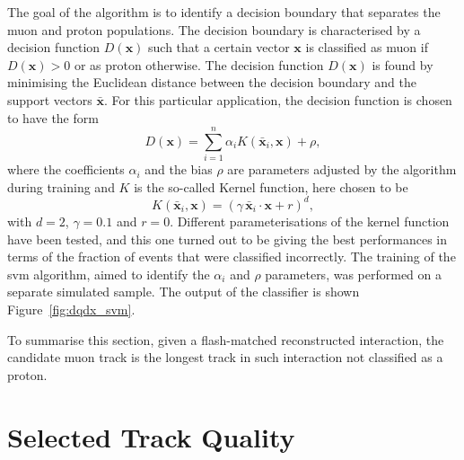 The goal of the algorithm is to identify a decision boundary that separates the muon and proton populations. The decision boundary is characterised by a decision function $D(\bm{x})$ such that a certain vector $\bm{x}$ is classified as muon if $D(\bm{x}) > 0$ or as proton otherwise.
The decision function $D(\bm{x})$ is found by minimising the Euclidean distance between the decision boundary and the support vectors $\bar{\bm{x}}$.
For this particular application, the decision function is chosen to have the form  
\begin{equation}
D(\bm{x}) =  \sum_{i=1}^{n} \alpha_i K( \bar{\bm{x}}_i, \bm{x}) + \rho,
\end{equation}
where the coefficients $\alpha_i$ and the bias $\rho$ are parameters adjusted by the algorithm during training and $K$ is the so-called Kernel function, here chosen to be
\begin{equation}
K( \bar{\bm{x}}_i, \bm{x}) = \left ( \gamma \, \bar{\bm{x}}_i \cdot \bm{x} + r \right ) ^d,
\end{equation}
with $d = 2$, $\gamma = 0.1$ and $r = 0$. Different parameterisations of the kernel function have been tested, and this one turned out to be giving the best performances in terms of the fraction of events that were classified incorrectly.
The training of the \acrshort{svm} algorithm, aimed to identify the $\alpha_i$ and $\rho$ parameters, was performed on a separate simulated sample. The output of the classifier is shown Figure~\ref{fig:dqdx_svm}. 

To summarise this section, given a flash-matched reconstructed interaction, the candidate muon track is the longest track in such interaction not classified as a proton.








\section{Selected Track Quality}
\label{sec:selection_quality}


